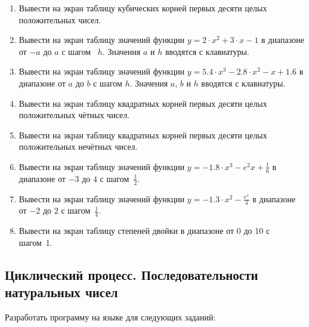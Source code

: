 \begin{enumerate}
\item Вывести на экран таблицу кубических корней первых десяти целых положительных чисел.
\item Вывести на экран таблицу значений функции  $y=2\cdot x^2+3\cdot x-1$  в диапазоне от  $-a$  до  $a$  с шагом~
$h$. Значения  $a$  и  $h$  вводятся с клавиатуры.
\item Вывести на экран таблицу значений функции  $y=5.4\cdot x^{3}-2.8\cdot x^{2}-x+1.6$  в диапазоне от  $a$  до  $b$ 
с шагом  $h$. Значения  $a$,  $b$  и  $h$  вводятся с клавиатуры.
\item Вывести на экран таблицу квадратных корней первых десяти целых положительных чётных чисел.
\item Вывести на экран таблицу квадратных корней первых десяти целых положительных нечётных чисел.
\item Вывести на экран таблицу значений функции  $y=-1.8\cdot x^3-e^2x+\frac{1}{6}$  в диапазоне от  $-3$ до  $4$  с
шагом~$\frac{1}{2}$.
\item Вывести на экран таблицу значений функции  $y=-1.3\cdot x^2-\frac{e^x}{4}$  в диапазоне от  $-2$  до  $2$  с
шагом~$\frac{1}{4}$.
\item Вывести на экран таблицу степеней двойки в диапазоне от  0  до  10  с шагом~1.
\end{enumerate}

\subsection[Циклический процесс. Последовательности натуральных чисел]{Циклический процесс. Последовательности
натуральных чисел}
Разработать программу на языке  для следующих заданий:

